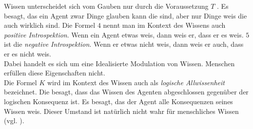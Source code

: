 Wissen unterscheidet sich vom Gauben nur durch die Voraussetzung $T$ \TFormel.
Es besagt, das ein Agent zwar Dinge glauben kann die \false sind, aber nur Dinge weis die auch wirklich \true sind.
Die Formel $4$ \vierFormel nennt man im Kontext des Wissens auch \emph{positive Introspektion}. 
Wenn ein Agent etwas weis, dann weis er, dass er es weis.
$5$ \fuenfFormel ist die \emph{negative Introspektion}. Wenn er etwas nicht weis, dann weis er auch, dass er es nicht weis.\\
Dabei handelt es sich um eine Idealisierte Modulation von Wissen.
Menschen erfüllen diese Eigenschaften nicht.\\
Die Formel $K$ \KFormel wird im Kontext des Wissen auch als \emph{logische Allwissenheit} bezeichnet.
Die besagt, dass das Wissen des Agenten abgeschlossen gegenüber der logischen Konsequenz ist.
Es besagt, das der Agent alle Konsequenzen seines Wissen weis. Dieser Umstand ist natürlich nicht wahr für menschliches Wissen (vgl. \cite[S.319f]{huth2004logic}).








